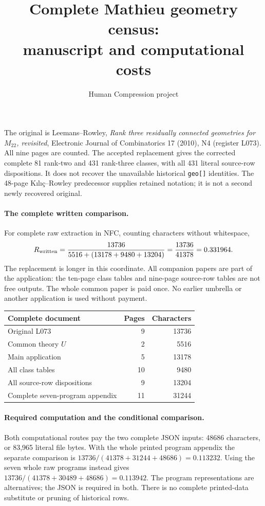 \documentclass[11pt,a4paper]{article}
\title{Complete Mathieu geometry census:\\manuscript and computational costs}
\author{Human Compression project}\date{}
\begin{document}
\maketitle
The original is Leemans--Rowley, \emph{Rank three residually connected
geometries for $M_{22}$, revisited}, Electronic Journal of Combinatorics
17 (2010), N4 (register L073). All nine pages are counted. The accepted
replacement gives the corrected complete 81 rank-two and 431 rank-three
classes, with all 431 literal source-row dispositions. It does not recover
the unavailable historical \texttt{geo[]} identities. The 48-page
Kılıç--Rowley predecessor supplies retained notation; it is not a second
newly recovered original.

\paragraph{The complete written comparison.}
For complete raw extraction in NFC, counting characters without whitespace,
\[
 R_{\rm written}=\frac{13736}{5516+(13178+9480+13204)}
 =\frac{13736}{41378}=0.331964.
\]
The replacement is longer in this coordinate. All companion papers are
part of the application: the ten-page class tables and nine-page source-row
tables are not free outputs. The whole common paper is paid once. No earlier
umbrella or another application is used without payment.
\begin{center}\begin{tabular}{lrr}\toprule
Complete document&Pages&Characters\\\midrule
Original L073&9&13736\\
Common theory $U$&2&5516\\
Main application&5&13178\\
All class tables&10&9480\\
All source-row dispositions&9&13204\\
Complete seven-program appendix&11&31244\\\bottomrule
\end{tabular}\end{center}
\paragraph{Required computation and the conditional comparison.}
Both computational routes pay the two complete JSON inputs: 48686
characters, or 83,965 literal file bytes. With the whole printed program
appendix the separate comparison is
$13736/(41378+31244+48686)=0.113232$.
Using the seven whole raw programs instead gives
$13736/(41378+30489+48686)=0.113942$.
The program representations are alternatives; the JSON is required in both.
There is no complete printed-data substitute or pruning of historical rows.
\end{document}
